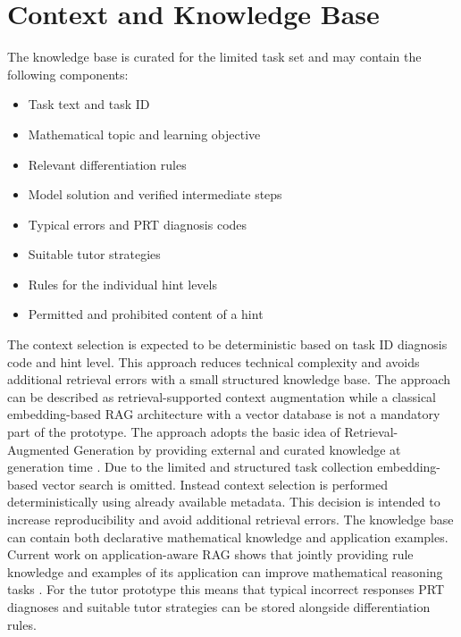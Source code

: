\documentclass[11pt,a4paper,oneside,ngerman]{memoir}
\begin{document}
\section{Context and Knowledge Base}
The knowledge base is curated for the limited task set and may contain the following components:
\begin{itemize}
    \item Task text and task ID
    \item Mathematical topic and learning objective
    \item Relevant differentiation rules
    \item Model solution and verified intermediate steps
    \item Typical errors and PRT diagnosis codes
    \item Suitable tutor strategies
    \item Rules for the individual hint levels
    \item Permitted and prohibited content of a hint
\end{itemize}
The context selection is expected to be deterministic based on task ID diagnosis code and hint level. This approach reduces technical complexity and avoids additional retrieval errors with a small structured knowledge base. The approach can be described as retrieval-supported context augmentation while a classical embedding-based RAG architecture with a vector database is not a mandatory part of the prototype.
The approach adopts the basic idea of Retrieval-Augmented Generation by providing external and curated knowledge at generation time \autocite{lewis2020rag}. Due to the limited and structured task collection embedding-based vector search is omitted. Instead context selection is performed deterministically using already available metadata. This decision is intended to increase reproducibility and avoid additional retrieval errors.
The knowledge base can contain both declarative mathematical knowledge and application examples. Current work on application-aware RAG shows that jointly providing rule knowledge and examples of its application can improve mathematical reasoning tasks \autocite{wang2025ragplus}. For the tutor prototype this means that typical incorrect responses PRT diagnoses and suitable tutor strategies can be stored alongside differentiation rules.
\end{document}
